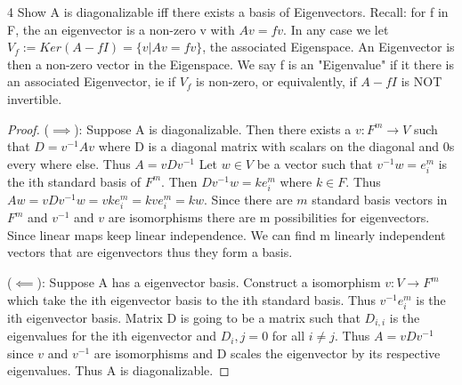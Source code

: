 \documentclass{article}
\newcommand{\rarr}[0]{\rightarrow}
\begin{document}
\bigskip

\begin{PROB}{4}\label{Problem 4.}
    Show A is diagonalizable iff there exists a basis of Eigenvectors. Recall: for f in F, the  an eigenvector is a non-zero v with $Av = fv$. In any case we let  $V_f := Ker(A - fI) = \{v| Av = fv\}$, the associated Eigenspace. An Eigenvector is then a non-zero vector in the Eigenspace. We say f is an "Eigenvalue" if it there is an associated Eigenvector, ie if $V_f$ is non-zero, or equivalently, if $A - fI$ is NOT invertible.
\end{PROB}
\begin{proof}
    ($\implies$): Suppose A is diagonalizable. Then there exists a $v: F^m \rarr V$ such that $D = v^{-1}Av$ where D is a diagonal matrix with scalars on the diagonal and 0s every where else. Thus $A=vDv^{-1}$ Let $w \in V$ be a vector such that $v^{-1}w = e^m_i$ is the ith standard basis of $F^m$. Then $Dv^{-1}w = ke^m_i$ where $k \in F$. Thus $Aw = vDv^{-1}w = vke^m_i = kve^m_i = kw$. Since there are $m$ standard basis vectors in $F^m$ and $v^{-1}$ and $v$ are isomorphisms there are m possibilities for eigenvectors. Since linear maps keep linear independence. We can find m linearly independent vectors that are eigenvectors thus they form a basis.

    ($\impliedby$): Suppose A has a eigenvector basis.
    Construct a isomorphism $v: V \rarr F^m$ which take the ith eigenvector basis to the ith standard basis. Thus $v^{-1}e^m_i$ is the ith eigenvector basis. Matrix D is going to be a matrix such that $D_{i,i}$ is the eigenvalues for the ith eigenvector and $D_i,j = 0$ for all $i \neq j$. Thus $A = vDv^{-1}$ since $v$ and $v^{-1}$ are isomorphisms and D scales the eigenvector by its respective eigenvalues. Thus A is diagonalizable.
\end{proof}

\bigskip
\end{document}
